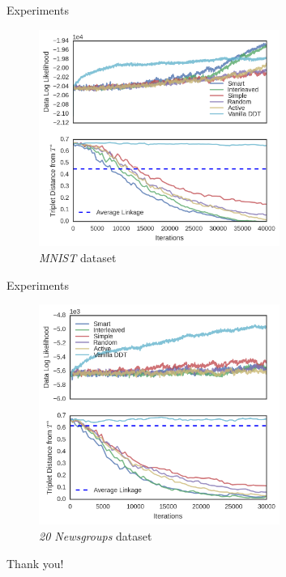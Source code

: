 \documentclass[10pt, compress]{beamer}
\begin{document}
\begin{frame}{Experiments}
\begin{figure}
    \centering
    \includegraphics[frame, width=0.7\textwidth]{img/interactive-2}
    \caption{\emph{MNIST} dataset}
    \label{fig:ibhc}
  \end{figure}
\end{frame}

\begin{frame}{Experiments}
\begin{figure}
    \centering
    \includegraphics[frame, width=0.7\textwidth]{img/interactive-3}
    \caption{\emph{20 Newsgroups} dataset}
    \label{fig:ibhc}
  \end{figure}
\end{frame}

\begin{frame}[standout]
Thank you!
\end{frame}
\end{document}
